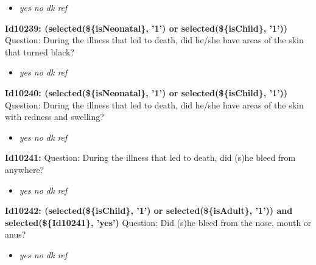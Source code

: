\documentclass{article}%
\begin{document}
%
\begin{itemize}%
\item%
\textit{yes\newline%
 no\newline%
 dk\newline%
 ref\newline%
}%
\end{itemize}%
\textbf{Id10239: (selected(\$\{isNeonatal\}, '1') or selected(\$\{isChild\}, '1'))\newline%
}%
Question: During the illness that led to death, did he/she have areas of the skin that turned black?\newline%
%
\begin{itemize}%
\item%
\textit{yes\newline%
 no\newline%
 dk\newline%
 ref\newline%
}%
\end{itemize}%
\textbf{Id10240: (selected(\$\{isNeonatal\}, '1') or selected(\$\{isChild\}, '1'))\newline%
}%
Question: During the illness that led to death, did he/she have areas of the skin with redness and swelling?\newline%
%
\begin{itemize}%
\item%
\textit{yes\newline%
 no\newline%
 dk\newline%
 ref\newline%
}%
\end{itemize}%
\textbf{Id10241: \newline%
}%
Question: During the illness that led to death, did (s)he bleed from anywhere?\newline%
%
\begin{itemize}%
\item%
\textit{yes\newline%
 no\newline%
 dk\newline%
 ref\newline%
}%
\end{itemize}%
\textbf{Id10242: (selected(\$\{isChild\}, '1') or selected(\$\{isAdult\}, '1')) and selected(\$\{Id10241\}, 'yes')\newline%
}%
Question: Did (s)he bleed from the nose, mouth or anus?\newline%
%
\begin{itemize}%
\item%
\textit{yes\newline%
 no\newline%
 dk\newline%
 ref\newline%
}%
\end{itemize}%
\end{document}
